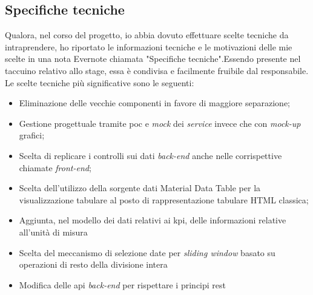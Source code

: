 \subsection{Specifiche tecniche}
Qualora, nel corso del progetto, io abbia dovuto effettuare scelte tecniche da intraprendere, ho riportato le informazioni tecniche e le motivazioni delle mie scelte in una nota Evernote chiamata "Specifiche tecniche".Essendo presente nel taccuino relativo allo stage, essa è condivisa e facilmente fruibile dal responsabile.
Le scelte tecniche più significative sono le seguenti:
\begin{itemize}
    \item Eliminazione delle vecchie componenti in favore di maggiore separazione;
    \item Gestione progettuale tramite \acrshort{poc} e \textit{mock} dei \textit{service} invece che con \textit{mock-up} grafici;
    \item Scelta di replicare i controlli sui dati \textit{back-end} anche nelle corrispettive chiamate \textit{front-end};
    \item Scelta dell'utilizzo della sorgente dati Material Data Table per la visualizzazione tabulare al posto di rappresentazione tabulare HTML classica;
    \item Aggiunta, nel modello dei dati relativi ai \acrshort{kpi}, delle informazioni relative all'unità di misura
    \item Scelta del meccanismo di selezione date per \textit{sliding window} basato su operazioni di resto della divisione intera
    \item Modifica delle \acrshort{api} \textit{back-end} per rispettare i principi \acrshort{rest}
\end{itemize}
\newpage
